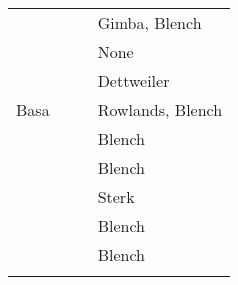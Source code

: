 \documentclass[output=paper]{langsci/langscibook}
\begin{document}
\begin{table}[t]
\begin{tabularx}{\textwidth}{lllQ}
	& 	& 	& Gimba, Blench\\
	& 	& 	& None\\
	& 	& 	& Dettweiler\\
% 
% 
Basa	& 	& 	& Rowlands, Blench\\
	& 	& 	& Blench\\
	& 	& 	& Blench\\
	& 	& 	& Sterk\\
	& 	& 	& Blench\\
	& 	& 	& Blench\\
\lspbottomrule
\end{tabularx}
\end{table}

 
\clearpage   
\sloppy
\printbibliography[heading=subbibliography,notkeyword=this] 
\end{document}
